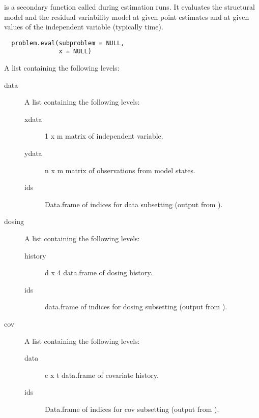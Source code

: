%
\begin{Description}\relax
{} is a secondary function called during estimation runs. It 
evaluates the structural model and the residual variability model at given
point estimates and at given values of the independent variable (typically
time).
\end{Description}
%
\begin{Usage}
\begin{verbatim}
  problem.eval(subproblem = NULL,
               x = NULL)
\end{verbatim}
\end{Usage}
%
\begin{Arguments}
\begin{ldescription}
\item[\code{subproblem}] A list containing the following levels:\begin{description}

\item[data] A list containing the following levels:\begin{description}

\item[xdata] 1 x m matrix of independent variable.
\item[ydata] n x m matrix of observations from model states.
\item[ids] Data.frame of indices for data subsetting (output
from ).

\end{description}

\item[dosing] A list containing the following levels:\begin{description}

\item[history] d x 4 data.frame of dosing history.
\item[ids] data.frame of indices for dosing subsetting
(output from ).

\end{description}

\item[cov] A list containing the following levels:\begin{description}

\item[data] c x t data.frame of covariate history.
\item[ids] Data.frame of indices for cov subsetting (output
from ).


\end{description}
\end{description}
\end{ldescription}
\end{Arguments}
